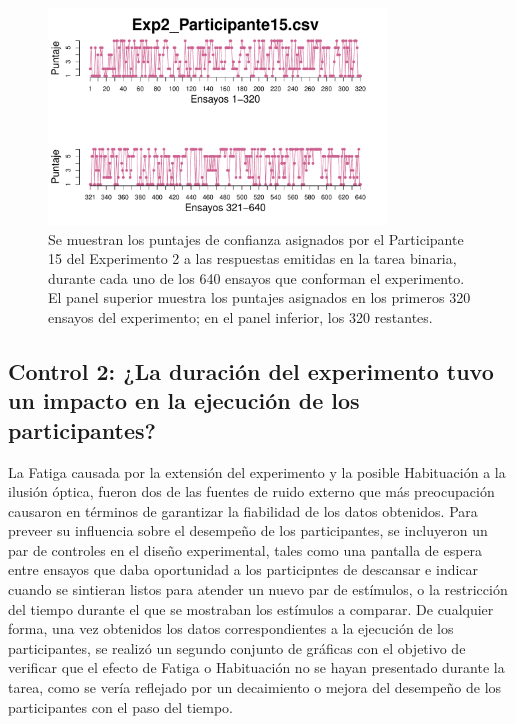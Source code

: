 \begin{itemize}
\begin{figure}[th]
\centering
\includegraphics[width=0.80\textwidth]{Figures/Rating_Exp2_P15} 
\caption[Asignación Puntaje de confianza: Ejemplo]{Se muestran los puntajes de confianza asignados por el Participante 15 del Experimento 2 a las respuestas emitidas en la tarea binaria, durante cada uno de los 640 ensayos que conforman el experimento. El panel superior muestra los puntajes asignados en los primeros 320 ensayos del experimento; en el panel inferior, los 320 restantes.}
\label{fig:Rating_E2_P4}
\end{figure}


\end{itemize}










\subsection{Control 2: ¿La duración del experimento tuvo un impacto en la ejecución de los participantes?}

La Fatiga causada por la extensión del experimento y la posible Habituación a la ilusión óptica, fueron dos de las fuentes de ruido externo que más preocupación causaron en términos de garantizar la fiabilidad de los datos obtenidos. Para preveer su influencia sobre el desempeño de los participantes, se incluyeron un par de controles en el diseño experimental, tales como una pantalla de espera entre ensayos que daba oportunidad a los participntes de descansar e indicar cuando se sintieran listos para atender un nuevo par de estímulos, o la restricción del tiempo durante el que se mostraban los estímulos a comparar. De cualquier forma, una vez obtenidos los datos correspondientes a la ejecución de los participantes, se realizó un segundo conjunto de gráficas con el objetivo de verificar que el efecto de Fatiga o Habituación no se hayan presentado durante la tarea, como se vería reflejado por un decaimiento o mejora del desempeño de los participantes con el paso del tiempo.\\ 

